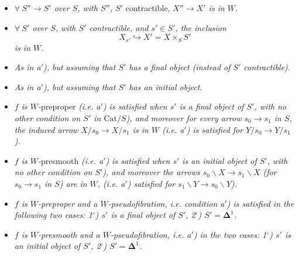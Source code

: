 \begin{itemize}[leftmargin=4em]
\item[\textit{a)}] \textit{$\forall\ S'' \longrightarrow S'$ over $S$, with $S''$, $S'$} contractible, \textit{$X'' \longrightarrow X'$ is in $W$.}

\item[\textit{a}$'$\textit{)}] \textit{$\forall\ S'$ over $S$, with $S'$ contractible, and $s' \in S'$, the inclusion} %
\[ X_{s'} \hookrightarrow X' = X \times_S S' \]
\textit{is in $W$.}

\item[\textit{a}$_1$\textit{)}] \textit{As in a$'$), but assuming that $S'$ has a final object (instead of $S'$ contractible).} %

\item[\textit{a}$_2$\textit{)}] \textit{As in a$'$), but assuming that $S'$ has an initial object.} %


\item[\textit{b}$_1$\textit{)}] \textit{$f$ is $W$-}preproper \textit{(i.e. a$'$) is satisfied when $s'$ is a final object of $S'$, with no other condition on $S'$ in $\mathrm{Cat}/S$), and moreover for every arrow $s_0 \longrightarrow s_1$ in $S$, the induced arrow $X/s_0 \longrightarrow X/s_1$ is in $W$ (i.e. a$'$) is satisfied for $Y/s_0 \longrightarrow Y/s_1$).}

\item[\textit{b}$_2$\textit{)}] \textit{$f$ is $W$-}presmooth \textit{(i.e. a$'$) is satisfied when $s'$ is an initial object of $S'$, with no other condition on $S'$), and moreover the arrows $s_0\backslash X \longrightarrow s_1\backslash X$ (for $s_0 \longrightarrow s_1$ in $S$) are in $W$, (i.e. a$'$) satisfied for $s_1\backslash Y \longrightarrow s_0\backslash Y$).}

\item[\textit{c}$_1$\textit{)}] \textit{$f$ is $W$-preproper and a $W$-pseudofibration, i.e. condition a$'$) is satisfied in the following two cases: 1$^\circ$) $s'$ is a final object of $S'$, 2$^\circ$) $S' = \mathbf{\Delta}^1$.}

\item[\textit{c}$_2$\textit{)}] \textit{$f$ is $W$-presmooth and a $W$-pseudofibration, i.e. a$'$) in the two cases: 1$^\circ$) $s'$ is an initial object of $S'$, 2$^\circ$) $S' = \mathbf{\Delta}^1$.}
\end{itemize}

